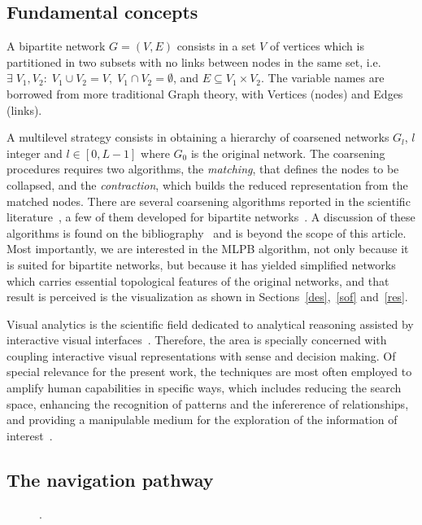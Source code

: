 \documentclass[runningheads]{llncs}
\begin{document}
\subsection{Fundamental concepts}\label{bac}
A bipartite network $G=(V,E)$ consists in a set $V$ of vertices which is partitioned in two subsets
with no links between nodes in the same set, i.e. $\exists\; V_1, V_2:\; V_1\cup V_2 = V,\;V_1\cap V_2 = \emptyset$, and $E\subseteq V_1 \times V_2$.
The variable names are borrowed from more traditional Graph theory, with Vertices (nodes) and Edges (links).

A multilevel strategy consists in obtaining a hierarchy of coarsened networks $G_l$, $l$ integer and $l \in [0,L-1]$ where $G_0$ is the original network.
The coarsening procedures requires two algorithms, the \emph{matching}, that defines the nodes to be collapsed, and the \emph{contraction}, which builds the reduced representation
from the matched nodes.
There are several coarsening algorithms reported in the scientific literature~\cite{}, a few of them
developed for bipartite networks~\cite{}.
A discussion of these algorithms is found on the bibliography~\cite{} and is beyond the scope of this article.
Most importantly, we are interested in the MLPB algorithm, not only because it is suited for bipartite networks, but because it has yielded simplified networks which carries essential topological features of the original networks, and that result is perceived is the visualization as shown in Sections~\ref{des},~\ref{sof} and~\ref{res}.

Visual analytics is the scientific field dedicated to analytical reasoning assisted by interactive visual interfaces~\cite{}.
Therefore, the area is specially concerned with coupling interactive visual representations with sense and decision making.
Of special relevance for the present work, the techniques are most often employed to amplify human capabilities in specific ways, which includes reducing the search space, enhancing the recognition of patterns and the infererence of relationships, and providing a manipulable medium for the exploration of the information of interest~\cite{}.

\subsection{The navigation pathway}



\begin{figure}[!h]\centering
  \caption{.
  }\label{fig:glob}
\end{figure}
\end{document}
